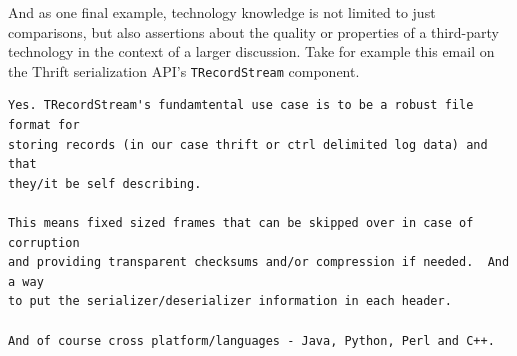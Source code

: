 \documentclass[a4paper, 12pt]{article}
\begin{document}
			And as one final example, technology knowledge is not limited to just comparisons, but also assertions about the quality or properties of a third-party technology in the context of a larger discussion. Take for example this email on the Thrift serialization API's \texttt{TRecordStream} component.
			\begin{verbatim}
Yes. TRecordStream's fundamtental use case is to be a robust file format for
storing records (in our case thrift or ctrl delimited log data) and that
they/it be self describing.

This means fixed sized frames that can be skipped over in case of corruption
and providing transparent checksums and/or compression if needed.  And a way
to put the serializer/deserializer information in each header.

And of course cross platform/languages - Java, Python, Perl and C++.
			\end{verbatim}
			
\end{document}
